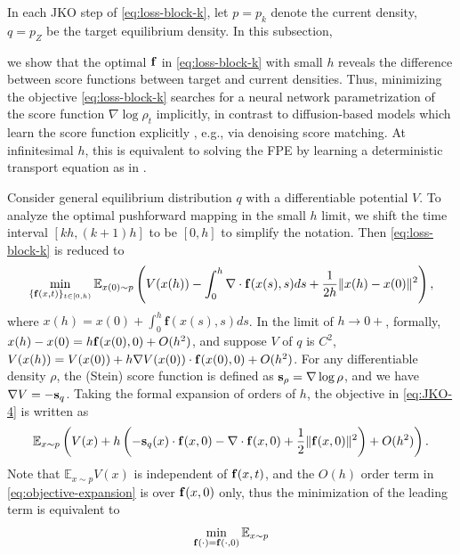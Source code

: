 \documentclass{article}
\theoremstyle{remark}
\theoremstyle{plain}
\newcommand{\E}{\mathbb{E}}
\newcommand{\revold}[1]{{\color{black}#1}}
\begin{document}
In each JKO step of \eqref{eq:loss-block-k}, 
let $p = p_k$ denote the current density, $q = p_Z$ be the target equilibrium density. 
In this subsection, 
{we show that the optimal ${\bf f}$ in 
\eqref{eq:loss-block-k} with small $h$ reveals the difference between score functions between target and current densities. 
Thus, minimizing the objective \eqref{eq:loss-block-k} searches for a neural network parametrization of the score function $\nabla \log \rho_t$ implicitly,
in contrast to diffusion-based models which learn the score function explicitly \citep{ho2020denoising,song2021score}, e.g., via denoising score matching.
\revold{At infinitesimal $h$, this is equivalent to solving the FPE by learning a deterministic transport equation as in \citep{boffi2023probability,shen2022self}.}

Consider general equilibrium distribution $q$ with a differentiable potential $V$.
To analyze the optimal pushforward mapping in the small $h$ limit,  we shift the time interval $[kh, (k+1)h]$ to be $[0,h]$ to simplify the notation. 
Then \eqref{eq:loss-block-k} is reduced to 
\begin{equation}\label{eq:JKO-4}
  \min_{ \{ {\bf f}(x,t) \}_{t \in [0,h)} } 
  \E_{x(0) \sim p}  
\left(  V( x(h))  
 -  \int_{0}^{h }\nabla\cdot\mathbf{f}( x (s),s )ds  
 +\frac{1}{2h}  \|  x(h)  -  x(0)  \|^{2} \right), 
\end{equation}
where
$x(h) = x(0) + \int_{0 }^{h }  \mathbf{f}( x (s),s)ds$.
In the limit of $h \to 0+$, formally,
$x(h)-x(0) = h {\bf f}( x(0), 0) + O(h^2)$,
and suppose $V$ of $q$ is $C^2$, 
$
V( x(h))
= V(x(0)) + h  \nabla V(x(0)) \cdot {\bf f}( x(0), 0) + O(h^2)$.
For any differentiable density $\rho$, the (Stein) score function is defined as  $ {\bf s}_\rho = \nabla \log \rho $,
and we have $\nabla V = - {\bf s}_q$.
Taking the formal expansion of orders of $h$, the objective in \eqref{eq:JKO-4} is written as
\begin{equation}\label{eq:objective-expansion}
\E_{x \sim p}  \left( 
 V(x) + h \left(  - {\bf s}_q(x ) \cdot {\bf f}( x , 0) 
 -   \nabla\cdot\mathbf{f}( x,0 )
 +\frac{1}{2}    \|    {\bf f}( x, 0) \|^2 \right) + O(h^2)  \right).
\end{equation}
Note that $\E_{ x \sim p}V(x)$ is independent of ${\bf f}(x,t)$, 
and the $O(h)$ order term in \eqref{eq:objective-expansion} is over ${\bf f}(x,0)$ only, 
thus the minimization of the leading term is equivalent to 
\begin{equation}\label{eq:L2-stein}
\min_{ {\bf f}(\cdot) = {\bf f} (\cdot,0) } \E_{x \sim p} 

\end{equation}}
\end{document}
